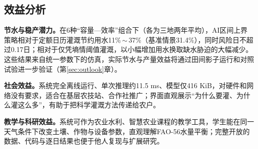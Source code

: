 \subsection{效益分析}
\textbf{节水与稳产潜力。}在6种“容量—效率”组合下（各为三地两年平均），AI区间上界策略相对于定额日历灌溉节约用水11\%\,$\sim$\,37\%（基准情景31.4\%），同时风险日不超过0.17日；相对于仅凭墒情阈值灌溉，以小幅增加用水换取缺水胁迫的大幅减少。这些结果来自统一参数下的仿真，实际节水与产量效益将通过田间影子运行和对照试验进一步验证（第\ref{sec:outlook}章）。

\textbf{社会效益。}系统完全离线运行、单次推理约11.5 ms、模型仅416 KiB，对硬件和网络没有要求，适合在基层农技站、合作社推广；界面直观展示“为什么要灌、为什么灌这么多”，有助于把科学灌溉方法传递给农户。

\textbf{教学与科研效益。}系统可作为农业水利、智慧农业课程的教学工具，学生能在同一天气条件下改变土壤、作物与设备参数，直观理解FAO-56水量平衡；完整开放的数据、代码与逐日结果也便于他人复现与扩展研究。
